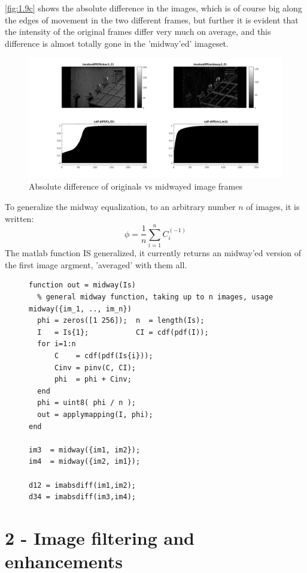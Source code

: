\documentclass[a4paper]{article}
\begin{document}
\autoref{fig:1.9c} shows the absolute difference in the images, which is of course big along the edges of movement in the two different frames, but further it is evident that the intensity of the original frames differ very much on average, and this difference is almost totally gone in the 'midway'ed' imageset.

\begin{figure}[h!]
  \centering
  \includegraphics[width=0.8\linewidth, trim={110 0 110 0 }, clip=true]{./1_9c.png}
  \caption{Absolute difference of originals vs midwayed image frames}
  \label{fig:1.9c}
\end{figure}

To generalize the midway equalization, to an arbitrary number $n$ of images, it is written:
$$ \phi = \frac{1}{n} \sum_{i=1}^{n} C^{(-1)}_i $$
The matlab function IS generalized, it currently returns an midway'ed version of the first image argment, 'averaged' with them all.

\begin{figure}[h!]
  \begin{lstlisting}[caption='Midway function and its application.']
function out = midway(Is)
  % general midway function, taking up to n images, usage midway({im_1, .., im_n})
  phi = zeros([1 256]);  n  = length(Is);
  I   = Is{1};           CI = cdf(pdf(I));
  for i=1:n
      C    = cdf(pdf(Is{i}));
      Cinv = pinv(C, CI);
      phi  = phi + Cinv;
  end
  phi = uint8( phi / n );
  out = applymapping(I, phi);
end

im3  = midway({im1, im2});
im4  = midway({im2, im1});

d12 = imabsdiff(im1,im2);
d34 = imabsdiff(im3,im4);\end{lstlisting}
\end{figure}

\clearpage
\section*{2 - Image filtering and enhancements}
\end{document}
